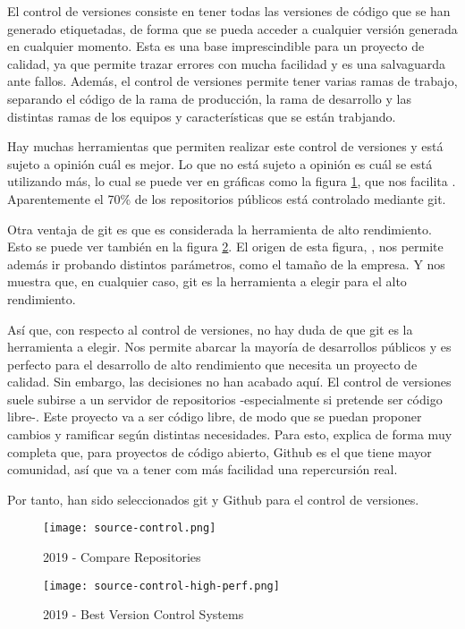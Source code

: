 El control de versiones consiste en tener todas las versiones de código que se han generado etiquetadas, de forma que se pueda acceder a cualquier versión generada en cualquier momento. Esta es una base imprescindible para un proyecto de calidad, ya que permite trazar errores con mucha facilidad y es una salvaguarda ante fallos. Además, el control de versiones permite tener varias ramas de trabajo, separando el código de la rama de producción, la rama de desarrollo y las distintas ramas de los equipos y características que se están trabjando.

Hay muchas herramientas que permiten realizar este control de versiones y está sujeto a opinión cuál es mejor. Lo que no está sujeto a opinión es cuál se está utilizando más, lo cual se puede ver en gráficas como la figura \cref{fig:bd:source-control}, que nos facilita \citet{BDSRCMP}. Aparentemente el 70\% de los repositorios públicos está controlado mediante git. 

Otra ventaja de git es que es considerada la herramienta de alto rendimiento. Esto se puede ver también en la figura \cref{fig:g2:source-control}. El origen de esta figura, \citet{G2SRCMP}, nos permite además ir probando distintos parámetros, como el tamaño de la empresa. Y nos muestra que, en cualquier caso, git es la herramienta a elegir para el alto rendimiento.

Así que, con respecto al control de versiones, no hay duda de que git es la herramienta a elegir. Nos permite abarcar la mayoría de desarrollos públicos y es perfecto para el desarrollo de alto rendimiento que necesita un proyecto de calidad. Sin embargo, las decisiones no han acabado aquí. El control de versiones suele subirse a un servidor de repositorios -especialmente si pretende ser código libre-. Este proyecto va a ser código libre, de modo que se puedan proponer cambios y ramificar según distintas necesidades. Para esto, \citet{GHVSGL} explica de forma muy completa que, para proyectos de código abierto, Github es el que tiene mayor comunidad, así que va a tener com más facilidad una repercursión real.

Por tanto, han sido seleccionados git y Github para el control de versiones.

\begin{figure}
	\centering
	\texttt{[image: source-control.png]}
	\caption{2019 - Compare Repositories}
	\label{fig:bd:source-control}
\end{figure}

\begin{figure}
	\centering
	\texttt{[image: source-control-high-perf.png]}
	\caption{2019 - Best Version Control Systems}
	\label{fig:g2:source-control}
\end{figure}